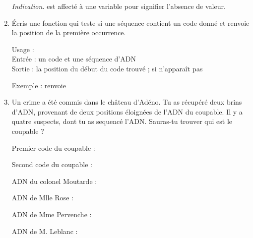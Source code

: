 \documentclass[11pt,class=report,crop=false]{standalone}
\begin{document}
\begin{activite}[ADN]
\begin{enumerate}
  \emph{Indication.}  est affecté à une variable pour signifier l'absence de valeur. 
  
  \item Écris une fonction  qui teste si une séquence contient un code donné et renvoie la position de la première occurrence.
  
  \begin{fonction}[\ci{position()}]
  Usage :  \\
  Entrée : un code et une séquence d'ADN \\
  Sortie : la position du début du code trouvé ;  si n'apparaît pas
  
  \medskip
    
  Exemple :  renvoie 
  \end{fonction}
    
  
  \item Un crime a été commis dans le château d'Adéno. 
Tu as récupéré deux brins d'ADN, provenant de deux positions éloignées de l'ADN du coupable. Il y a quatre suspects, dont tu as sequencé l'ADN.
Sauras-tu trouver qui est le coupable ?

Premier code du coupable :  

Second code du coupable : 

{\small
ADN du colonel Moutarde :



ADN de Mlle Rose :



ADN de Mme Pervenche :



ADN de M. Leblanc :

}
\end{enumerate}
\end{activite}


\end{document}
